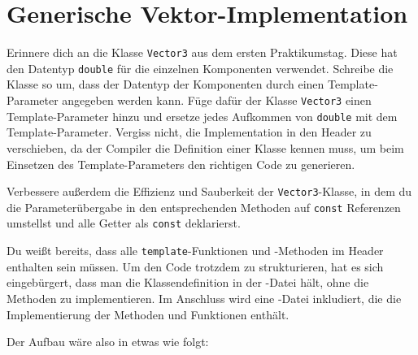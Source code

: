 \section{Generische Vektor-Implementation}
Erinnere dich an die Klasse \lstinline{Vector3} aus dem ersten Praktikumstag.
Diese hat den Datentyp \lstinline{double} für die einzelnen Komponenten verwendet.
Schreibe die Klasse so um, dass der Datentyp der Komponenten durch einen Template-Parameter angegeben werden kann.
Füge dafür der Klasse \lstinline{Vector3} einen Template-Parameter hinzu und ersetze jedes Aufkommen von \lstinline{double} mit dem Template-Parameter.
Vergiss nicht, die Implementation in den Header zu verschieben, da der Compiler die Definition einer Klasse kennen muss, um beim Einsetzen des Template-Parameters den richtigen Code zu generieren.

Verbessere außerdem die Effizienz und Sauberkeit der \lstinline{Vector3}-Klasse, in dem du die Parameterübergabe in den entsprechenden Methoden auf \lstinline{const} Referenzen umstellst und alle Getter als \lstinline{const} deklarierst.

Du weißt bereits, dass alle \lstinline{template}-Funktionen und -Methoden im Header enthalten sein müssen.
Um den Code trotzdem zu strukturieren, hat es sich eingebürgert, dass man die Klassendefinition in der -Datei hält, ohne die Methoden zu implementieren.
Im Anschluss wird eine -Datei inkludiert, die die Implementierung der Methoden und Funktionen enthält.
    
Der Aufbau wäre also in etwas wie folgt:

